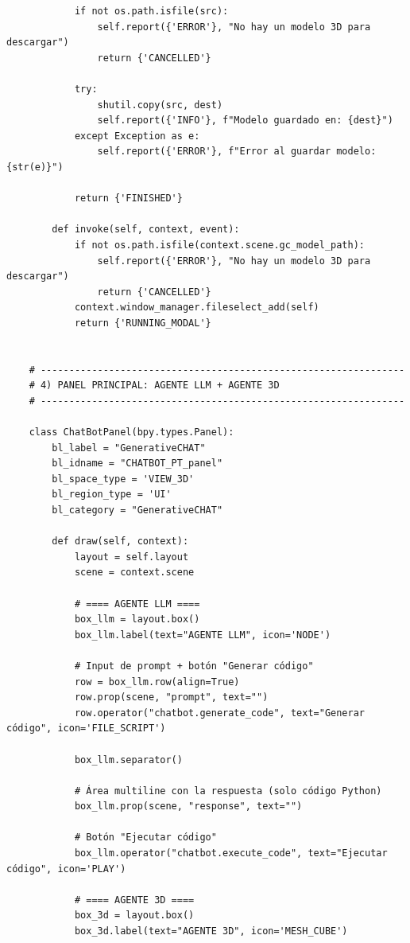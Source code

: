 \begin{verbatim}
            if not os.path.isfile(src):
                self.report({'ERROR'}, "No hay un modelo 3D para descargar")
                return {'CANCELLED'}
    
            try:
                shutil.copy(src, dest)
                self.report({'INFO'}, f"Modelo guardado en: {dest}")
            except Exception as e:
                self.report({'ERROR'}, f"Error al guardar modelo: {str(e)}")
    
            return {'FINISHED'}
    
        def invoke(self, context, event):
            if not os.path.isfile(context.scene.gc_model_path):
                self.report({'ERROR'}, "No hay un modelo 3D para descargar")
                return {'CANCELLED'}
            context.window_manager.fileselect_add(self)
            return {'RUNNING_MODAL'}
    
    
    # ----------------------------------------------------------------
    # 4) PANEL PRINCIPAL: AGENTE LLM + AGENTE 3D
    # ----------------------------------------------------------------
    
    class ChatBotPanel(bpy.types.Panel):
        bl_label = "GenerativeCHAT"
        bl_idname = "CHATBOT_PT_panel"
        bl_space_type = 'VIEW_3D'
        bl_region_type = 'UI'
        bl_category = "GenerativeCHAT"
    
        def draw(self, context):
            layout = self.layout
            scene = context.scene
    
            # ==== AGENTE LLM ====
            box_llm = layout.box()
            box_llm.label(text="AGENTE LLM", icon='NODE')
    
            # Input de prompt + botón "Generar código"
            row = box_llm.row(align=True)
            row.prop(scene, "prompt", text="")
            row.operator("chatbot.generate_code", text="Generar código", icon='FILE_SCRIPT')
    
            box_llm.separator()
    
            # Área multiline con la respuesta (solo código Python)
            box_llm.prop(scene, "response", text="")
    
            # Botón "Ejecutar código"
            box_llm.operator("chatbot.execute_code", text="Ejecutar código", icon='PLAY')
    
            # ==== AGENTE 3D ====
            box_3d = layout.box()
            box_3d.label(text="AGENTE 3D", icon='MESH_CUBE')
    

\end{verbatim}
